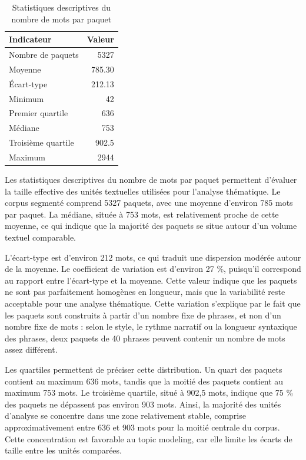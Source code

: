 \begin{table}[H]
\centering
\caption{Statistiques descriptives du nombre de mots par paquet}
\begin{tabular}{lr}
\toprule
\textbf{Indicateur} & \textbf{Valeur} \\
\midrule
Nombre de paquets & 5327 \\
Moyenne & 785.30 \\
Écart-type & 212.13 \\
Minimum & 42 \\
Premier quartile & 636 \\
Médiane & 753 \\
Troisième quartile & 902.5 \\
Maximum & 2944 \\
\bottomrule
\end{tabular}
\end{table}

Les statistiques descriptives du nombre de mots par paquet permettent d'évaluer la taille effective des unités textuelles utilisées pour l'analyse thématique. Le corpus segmenté comprend 5327 paquets, avec une moyenne d'environ 785 mots par paquet. La médiane, située à 753 mots, est relativement proche de cette moyenne, ce qui indique que la majorité des paquets se situe autour d'un volume textuel comparable.

L'écart-type est d'environ 212 mots, ce qui traduit une dispersion modérée autour de la moyenne. Le coefficient de variation est d'environ 27 \%, puisqu'il correspond au rapport entre l'écart-type et la moyenne. Cette valeur indique que les paquets ne sont pas parfaitement homogènes en longueur, mais que la variabilité reste acceptable pour une analyse thématique. Cette variation s'explique par le fait que les paquets sont construits à partir d'un nombre fixe de phrases, et non d'un nombre fixe de mots : selon le style, le rythme narratif ou la longueur syntaxique des phrases, deux paquets de 40 phrases peuvent contenir un nombre de mots assez différent.

Les quartiles permettent de préciser cette distribution. Un quart des paquets contient au maximum 636 mots, tandis que la moitié des paquets contient au maximum 753 mots. Le troisième quartile, situé à 902,5 mots, indique que 75 \% des paquets ne dépassent pas environ 903 mots. Ainsi, la majorité des unités d'analyse se concentre dans une zone relativement stable, comprise approximativement entre 636 et 903 mots pour la moitié centrale du corpus. Cette concentration est favorable au topic modeling, car elle limite les écarts de taille entre les unités comparées.


